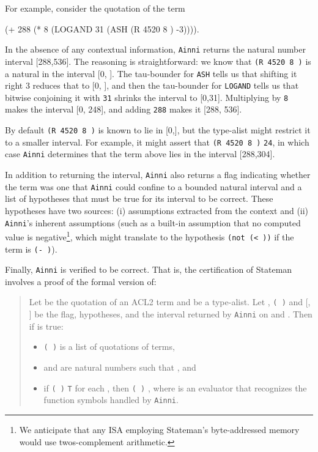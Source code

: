 \documentclass[submission,copyright,creativecommons]{eptcs}
\newcommand{\ptt}[1]{\tt{#1}}
\begin{document}
For example, consider the quotation of the term
\begin{acl2p}
(+ 288 (* 8 (LOGAND 31 (ASH (R 4520 8 ) -3)))).
\end{acl2p}
In the absence of any contextual information, {\ptt{Ainni}} returns the
natural number interval [288,536].  The reasoning is straightforward: we know
that {\ptt{(R 4520 8 )}} is a natural in the interval [0, ].
The tau-bounder for {\ptt{ASH}} tells us that shifting it right 3 reduces
that to [0, ], and then the tau-bounder for {\ptt{LOGAND}} tells us
that bitwise conjoining it with {\ptt{31}} shrinks the interval to [0,31].
Multiplying by {\ptt{8}} makes the interval [0, 248], and adding {\ptt{288}}
makes it [288, 536].



By default {\ptt{(R 4520 8 )}} is known to lie in
[0,], but the type-alist might restrict it to a smaller interval.
For example, it might assert that {\ptt{(R 4520 8 )}}  {\ptt{24}}, in which case
{\ptt{Ainni}} determines that the term above lies in the interval [288,304].

In addition to returning the interval, {\ptt{Ainni}} also returns a flag
indicating whether the term was one that {\ptt{Ainni}} could confine to a
bounded natural interval and a list of hypotheses that must be true for its
interval to be correct.  These hypotheses have two sources: (i) assumptions
extracted from the context and (ii) {\ptt{Ainni}}'s inherent assumptions
(such as a built-in assumption that no computed value is negative\footnote{We
  anticipate that any ISA employing Stateman's byte-addressed memory would
  use twos-complement arithmetic.}, which might translate to the hypothesis
{\ptt{(not (<  ))}} if the term is {\ptt{(-  )}}).

Finally, {\ptt{Ainni}} is verified to be correct.  That is, the certification of
Stateman involves a proof of the formal version of:

\begin{quotation} Let  be the quotation of an ACL2 term and  be a type-alist.
Let , {\ptt{(  )}} and [, ] be the flag, hypotheses, and the
interval returned by {\ptt{Ainni}} on  and .
Then if  is true:

\begin{itemize}
\item {\ptt{(  )}} is a list of quotations of terms,

\item  and  are natural numbers such that , and

\item if {\ptt{(  )}} 
  {\ptt{T}} for each , then  {\ptt{(  )}} ,
where  is an evaluator that recognizes the function symbols handled by {\ptt{Ainni}}.
\end{itemize}
\end{quotation}
\end{document}
